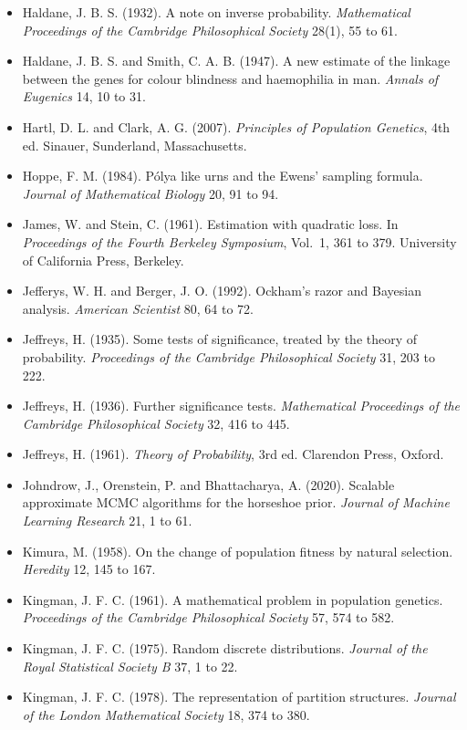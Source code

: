 \begin{itemize}
Dover, New York.
\item Haldane, J. B. S. (1932). A note on inverse probability. \emph{Mathematical Proceedings of
the Cambridge Philosophical Society} 28(1), 55 to 61.
\item Haldane, J. B. S. and Smith, C. A. B. (1947). A new estimate of the linkage between the genes
for colour blindness and haemophilia in man. \emph{Annals of Eugenics} 14, 10 to 31.
\item Hartl, D. L. and Clark, A. G. (2007). \emph{Principles of Population Genetics}, 4th ed.
Sinauer, Sunderland, Massachusetts.
\item Hoppe, F. M. (1984). P\'olya like urns and the Ewens' sampling formula. \emph{Journal of Mathematical Biology} 20, 91 to 94.
\item James, W. and Stein, C. (1961). Estimation with quadratic loss. In \emph{Proceedings of the
Fourth Berkeley Symposium}, Vol.\ 1, 361 to 379. University of California Press, Berkeley.
\item Jefferys, W. H. and Berger, J. O. (1992). Ockham's razor and Bayesian analysis.
\emph{American Scientist} 80, 64 to 72.
\item Jeffreys, H. (1935). Some tests of significance, treated by the theory of probability.
\emph{Proceedings of the Cambridge Philosophical Society} 31, 203 to 222.
\item Jeffreys, H. (1936). Further significance tests. \emph{Mathematical Proceedings of the
Cambridge Philosophical Society} 32, 416 to 445.
\item Jeffreys, H. (1961). \emph{Theory of Probability}, 3rd ed. Clarendon Press, Oxford.
\item Johndrow, J., Orenstein, P. and Bhattacharya, A. (2020). Scalable approximate MCMC algorithms for the
horseshoe prior. \emph{Journal of Machine Learning Research} 21, 1 to 61.
\item Kimura, M. (1958). On the change of population fitness by natural selection.
\emph{Heredity} 12, 145 to 167.
\item Kingman, J. F. C. (1961). A mathematical problem in population genetics.
\emph{Proceedings of the Cambridge Philosophical Society} 57, 574 to 582.
\item Kingman, J. F. C. (1975). Random discrete distributions. \emph{Journal of the Royal
Statistical Society B} 37, 1 to 22.
\item Kingman, J. F. C. (1978). The representation of partition structures.
\emph{Journal of the London Mathematical Society} 18, 374 to 380.

\end{itemize}
